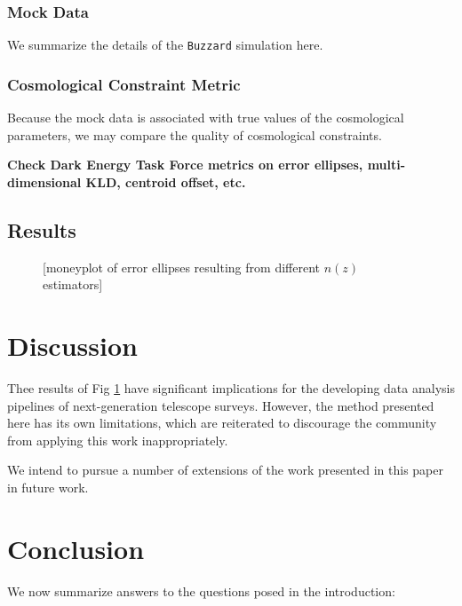 \documentclass[iop]{emulateapj}
\begin{document}
\subsubsection{Mock Data}
\label{sec:buzzard}

We summarize the details of the \texttt{Buzzard} simulation here.

\subsubsection{Cosmological Constraint Metric}
\label{sec:cosmo}

Because the mock data is associated with true values of the cosmological 
parameters, we may compare the quality of cosmological constraints.

\textbf{Check Dark Energy Task Force metrics on error ellipses, 
multi-dimensional KLD, centroid offset, etc.}

\subsection{Results}
\label{sec:results}

\begin{figure}
	\begin{center}
		\caption{[moneyplot of error ellipses resulting from different 
$n(z)$ estimators]}
		\label{fig:money}
	\end{center}
\end{figure}

\section{Discussion}
\label{sec:discussion}

Thee results of Fig \ref{fig:money} have significant implications for the 
developing data analysis pipelines of next-generation telescope surveys.  
However, the method presented here has its own limitations, which are 
reiterated to discourage the community from applying this work inappropriately.

We intend to pursue a number of extensions of the work presented in this paper 
in future work.

\section{Conclusion}
\label{sec:conclusion}

We now summarize answers to the questions posed in the introduction:
\end{document}
